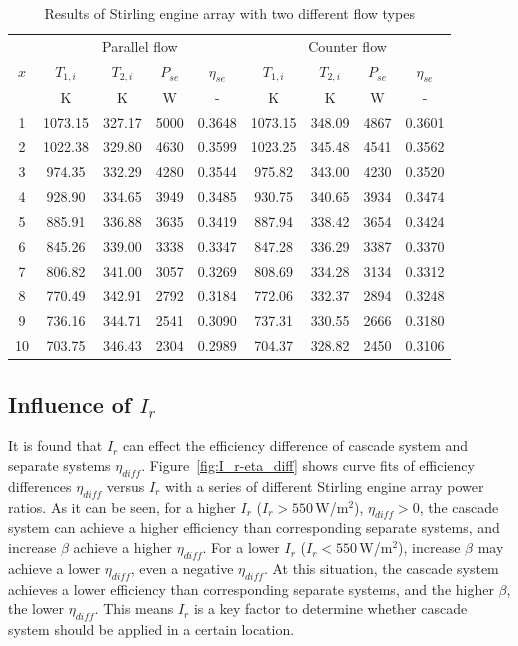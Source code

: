\documentclass{article}
\begin{document}
\begin{table}[htbp]
	\caption{Results of Stirling engine array with two different flow types}
	\begin{center}
	\begin{tabular}{ccccccccc}
		\toprule
		\multirow{3}{*}{$x$}	&	\multicolumn{4}{c}{Parallel flow}	&\multicolumn{4}{c}{Counter flow}\tabularnewline
		\cline{2-5}	\cline{6-9}
		&$T_{1,i}$&$T_{2,i}$&$P_{se}$&$\eta_{se}$&$T_{1,i}$&$T_{2,i}$&$P_{se}$&$\eta_{se}$\tabularnewline
		&K&K&W&-&K&K&W&-\tabularnewline
		\midrule
		1	&	1073.15	&	327.17	&	5000	&	0.3648	&	1073.15	&	348.09	&	4867	&	0.3601\\
		2	&	1022.38	&	329.80	&	4630	&	0.3599	&	1023.25	&	345.48	&	4541	&	0.3562\\
		3	&	974.35	&	332.29	&	4280	&	0.3544	&	975.82	&	343.00	&	4230	&	0.3520\\
		4	&	928.90	&	334.65	&	3949	&	0.3485	&	930.75	&	340.65	&	3934	&	0.3474\\
		5	&	885.91	&	336.88	&	3635	&	0.3419	&	887.94	&	338.42	&	3654	&	0.3424\\
		6	&	845.26	&	339.00	&	3338	&	0.3347	&	847.28	&	336.29	&	3387	&	0.3370\\
		7	&	806.82	&	341.00	&	3057	&	0.3269	&	808.69	&	334.28	&	3134	&	0.3312\\
		8	&	770.49	&	342.91	&	2792	&	0.3184	&	772.06	&	332.37	&	2894	&	0.3248\\
		9	&	736.16	&	344.71	&	2541	&	0.3090	&	737.31	&	330.55	&	2666	&	0.3180\\
		10	&	703.75	&	346.43	&	2304	&	0.2989	&	704.37	&	328.82	&	2450	&	0.3106\\
		\bottomrule
	\end{tabular}
	\end{center}
	\label{tab:SEAresults}
\end{table}

\subsection{Influence of $I_r$}

It is found that $I_r$ can effect the efficiency difference of cascade system and separate systems $\eta_{diff}$. Figure~\ref{fig:I_r-eta_diff} shows curve fits of efficiency differences $\eta_{diff}$ versus $I_r$ with a series of different Stirling engine array power ratios. As it can be seen, for a higher $I_r$ ($I_r > 550\,$W/m$^2$), $\eta_{diff}>0$, the cascade system can achieve a higher efficiency than corresponding separate systems, and increase $\beta$ achieve a higher $\eta_{diff}$. For a lower $I_r$ ($I_r < 550\,$W/m$^2$), increase $\beta$ may achieve a lower $\eta_{diff}$, even a negative $\eta_{diff}$. At this situation, the cascade system achieves a lower efficiency than corresponding separate systems, and the higher $\beta$, the lower $\eta_{diff}$. This means $I_r$ is a key factor to determine whether cascade system should be applied in a certain location.
\end{document}

